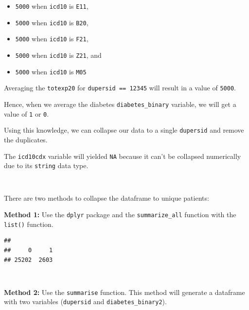 \documentclass[
]{book}
\newenvironment{Shaded}{\begin{snugshade}}{\end{snugshade}}
\newcommand{\DocumentationTok}[1]{\textcolor[rgb]{0.56,0.35,0.01}{\textbf{\textit{#1}}}}
\newcommand{\FunctionTok}[1]{\textcolor[rgb]{0.00,0.00,0.00}{#1}}
\newcommand{\NormalTok}[1]{#1}
\newcommand{\OtherTok}[1]{\textcolor[rgb]{0.56,0.35,0.01}{#1}}
\newcommand{\SpecialCharTok}[1]{\textcolor[rgb]{0.00,0.00,0.00}{#1}}
\begin{document}
\begin{itemize}
\item
  \texttt{5000} when \texttt{icd10} is \texttt{E11},
\item
  \texttt{5000} when \texttt{icd10} is \texttt{B20},
\item
  \texttt{5000} when \texttt{icd10} is \texttt{F21},
\item
  \texttt{5000} when \texttt{icd10} is \texttt{Z21}, and
\item
  \texttt{5000} when \texttt{icd10} is \texttt{M05}
\end{itemize}

Averaging the \texttt{totexp20} for \texttt{dupersid\ ==\ 12345} will result in a value of \texttt{5000}.

Hence, when we average the diabetes \texttt{diabetes\_binary} variable, we will get a value of \texttt{1} or \texttt{0}.

Using this knowledge, we can collapse our data to a single \texttt{dupersid} and remove the duplicates.

The \texttt{icd10cdx} variable will yielded \texttt{NA} because it can't be collapsed numerically due to its \texttt{string} data type.

\(~\)

There are two methods to collapse the dataframe to unique patients:

\textbf{Method 1:} Use the \texttt{dplyr} package and the \texttt{summarize\_all} function with the \texttt{list()} function.

\begin{Shaded}
\end{Shaded}

\begin{verbatim}
## 
##     0     1 
## 25202  2603
\end{verbatim}

\(~\)

\textbf{Method 2:} Use the \texttt{summarise} function. This method will generate a dataframe with two variables (\texttt{dupersid} and \texttt{diabetes\_binary2}).
\end{document}
